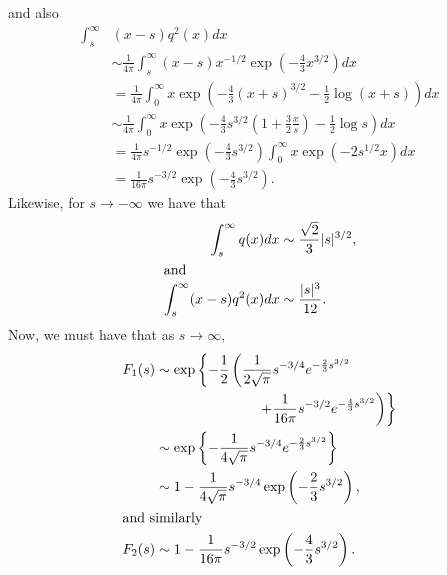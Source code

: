 \documentclass[final]{IEEEtran} %
\begin{document}
and also
\begin{align*}
    \int_s^\infty & (x - s) q^2(x) dx \\
        & \sim \frac{1}{4 \pi}
              \int_s^\infty
                  (x - s)
                  x^{-1/2}
                  \exp\left( -\frac{4}{3} x^{3/2} \right)
                  dx \\
        &= \frac{1}{4 \pi}
           \int_0^\infty
               x
               \exp\left(
                   -\frac{4}{3} (x + s)^{3/2}
                   -\frac{1}{2} \log( x + s )
               \right)
               dx \\
        &\sim \frac{1}{4 \pi}
              \int_0^\infty
              x
              \exp\left(
                  -\frac{4}{3}s^{3/2}
                  \left( 1 + \frac{3}{2} \frac{x}{s} \right)
                  - \frac{1}{2} \log s
              \right)
              dx \\
        &= \frac{1}{4 \pi}
           s^{-1/2}
           \exp\left( -\frac{4}{3} s^{3/2} \right)
           \int_0^\infty
                x
                \exp\left(
                    -2 s^{1/2} x
                \right)
                dx \\
        &= \frac{1}{16 \pi}
           s^{-3/2}
           \exp\left( -\frac{4}{3} s^{3/2} \right).
\end{align*}
Likewise, for $s \to -\infty$ we have that
\begin{align*}
    \int_s^\infty q(x) dx &\sim \frac{\sqrt{2}}{3} |s|^{3/2}, \\
\intertext{and}
    \int_s^\infty (x - s) q^2(x) dx &\sim \frac{|s|^3}{12}.
\end{align*}
Now, we must have that as $s\to\infty$,
\begin{align*}
    F_1(s)
        &\sim \exp\left\{
                  -\frac{1}{2}
                  \left(
                      \frac{1}{2 \sqrt{\pi}}
                      s^{-3/4}
                      e^{-\frac{2}{3} s^{3/2}}
                      \right. \right.
                      \\ & \qquad \qquad \qquad \quad\,
                      \left. \left.
                      +
                      \frac{1}{16 \pi}
                      s^{-3/2}
                      e^{-\frac{4}{3} s^{3/2}}
                  \right)
              \right\} \\
        &\sim \exp\left\{
                   -
                   \frac{1}{4 \sqrt{\pi}}
                   s^{-3/4}
                   e^{-\frac{2}{3} s^{3/2}}
              \right\} \\
        &\sim 1
              -
              \frac{1}{4 \sqrt{\pi}}
              s^{-3/4}
              \exp\left( -\frac{2}{3} s^{3/2} \right), \\
\intertext{and similarly}
    F_2(s) &\sim 1
                 -
                 \frac{1}{16 \pi}
                 s^{-3/2}
                 \exp\left( -\frac{4}{3} s^{3/2} \right).
\end{align*}
\end{document}
